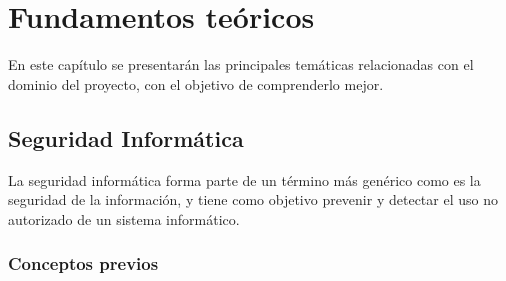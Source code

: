 \chapter{Fundamentos teóricos}
\label{sec:fundamentos}


En este capítulo se presentarán las principales temáticas relacionadas con el dominio del proyecto, con el objetivo de comprenderlo mejor.

\section{Seguridad Informática}
La seguridad informática forma parte de un término más genérico como es la seguridad de la información, y tiene como objetivo prevenir y detectar el uso no autorizado de un sistema informático.

\subsection{Conceptos previos}

